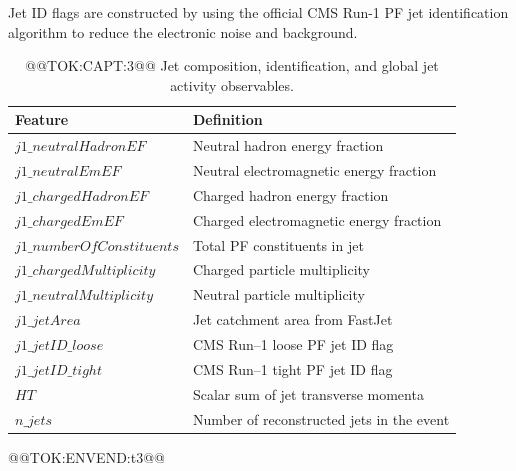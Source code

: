\documentclass[11pt]{article}
\begin{document}
Jet ID flags are constructed by using the official CMS Run-1 PF jet identification algorithm to reduce the electronic noise and background.
\begin{table}[H]
\centering
\caption{@@TOK:CAPT:3@@ Jet composition, identification, and global jet activity observables.}
\footnotesize

\begin{tabular}{ll}
\toprule
Feature & Definition \\
\midrule
$j1\_neutralHadronEF$ & Neutral hadron energy fraction \\
$j1\_neutralEmEF$     & Neutral electromagnetic energy fraction \\
$j1\_chargedHadronEF$ & Charged hadron energy fraction \\
$j1\_chargedEmEF$     & Charged electromagnetic energy fraction \\
$j1\_numberOfConstituents$ & Total PF constituents in jet \\
$j1\_chargedMultiplicity$ & Charged particle multiplicity \\
$j1\_neutralMultiplicity$ & Neutral particle multiplicity \\
$j1\_jetArea$ & Jet catchment area from FastJet \\
$j1\_jetID\_loose$ & CMS Run--1 loose PF jet ID flag \\
$j1\_jetID\_tight$ & CMS Run--1 tight PF jet ID flag \\
$HT$ & Scalar sum of jet transverse momenta \\
$n\_jets$ & Number of reconstructed jets in the event \\
\bottomrule
\end{tabular}

@@TOK:ENVEND:t3@@\end{table}
\end{document}
